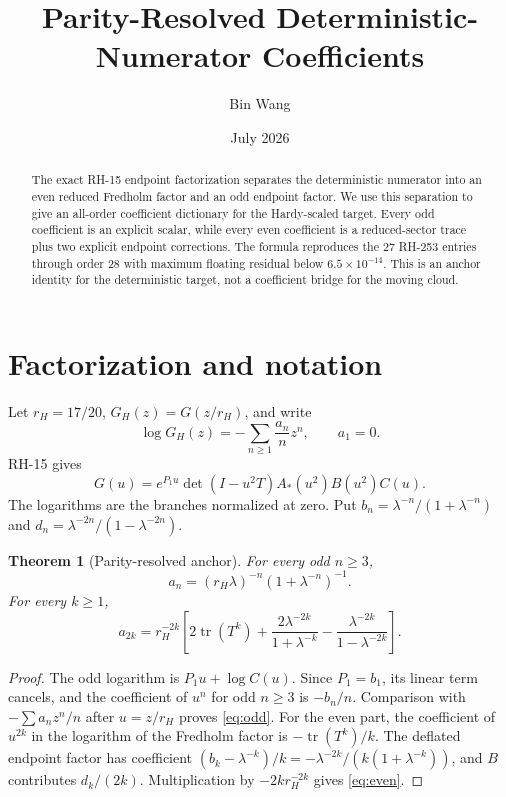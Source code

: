 \documentclass[11pt]{article}
\title{Parity-Resolved Deterministic-Numerator Coefficients}
\author{Bin Wang}\date{July 2026}
\newtheorem{theorem}{Theorem}[section]
\theoremstyle{remark}\newtheorem{remark}[theorem]{Remark}
\begin{document}
\maketitle

\begin{abstract}
The exact RH-15 endpoint factorization separates the deterministic numerator
into an even reduced Fredholm factor and an odd endpoint factor.  We use this
separation to give an all-order coefficient dictionary for the Hardy-scaled
target.  Every odd coefficient is an explicit scalar, while every even
coefficient is a reduced-sector trace plus two explicit endpoint corrections.
The formula reproduces the 27 RH-253 entries through order 28 with maximum
floating residual below $6.5\times10^{-14}$.  This is an anchor identity for
the deterministic target, not a coefficient bridge for the moving cloud.
\end{abstract}

\section{Factorization and notation}
Let $r_H=17/20$, $G_H(z)=G(z/r_H)$, and write
\[
 \log G_H(z)=-\sum_{n\ge1}\frac{a_n}{n}z^n,\qquad a_1=0.
\]
RH-15 gives \citep{WangRH15}
\begin{equation}
 G(u)=e^{P_1u}\det(I-u^2T)A_*(u^2)B(u^2)C(u).
 \label{eq:factor}
\end{equation}
The logarithms are the branches normalized at zero.  Put
$b_n=\lambda^{-n}/(1+\lambda^{-n})$ and
$d_n=\lambda^{-2n}/(1-\lambda^{-2n})$.

\begin{theorem}[Parity-resolved anchor]\label{thm:anchor}
For every odd $n\ge3$,
\begin{equation}
 a_n=(r_H\lambda)^{-n}(1+\lambda^{-n})^{-1}.
 \label{eq:odd}
\end{equation}
For every $k\ge1$,
\begin{equation}
 a_{2k}=r_H^{-2k}\left[
 2\operatorname{tr}(T^k)+\frac{2\lambda^{-2k}}{1+\lambda^{-k}}
 -\frac{\lambda^{-2k}}{1-\lambda^{-2k}}
 \right].
 \label{eq:even}
\end{equation}
\end{theorem}

\begin{proof}
The odd logarithm is $P_1u+\log C(u)$.  Since $P_1=b_1$, its linear term
cancels, and the coefficient of $u^n$ for odd $n\ge3$ is $-b_n/n$.
Comparison with $-\sum a_nz^n/n$ after $u=z/r_H$ proves \eqref{eq:odd}.
For the even part, the coefficient of $u^{2k}$ in the logarithm of the
Fredholm factor is $-\operatorname{tr}(T^k)/k$.  The deflated endpoint factor
has coefficient $(b_k-\lambda^{-k})/k=-\lambda^{-2k}/(k(1+\lambda^{-k}))$,
and $B$ contributes $d_k/(2k)$.  Multiplication by $-2k r_H^{-2k}$ gives
\eqref{eq:even}.
\end{proof}
\end{document}
